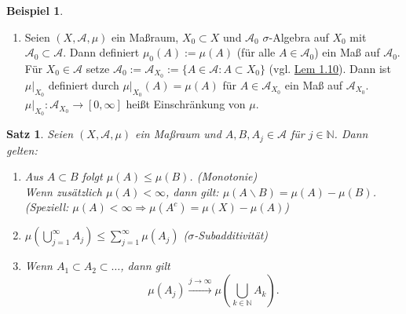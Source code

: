\documentclass[a4paper]{scrreprt}
\newcommand{\N}{\mathbb{N}}
\newcommand{\jlabel}[1]{\label{j_#1}}
\newcommand{\jhyperref}[2]{\hyperref[j_#1]{#2}}
\newcommand{\jlink}[1]{\jhyperref{#1}{#1}}
\theoremstyle{plain}
\newtheorem{satz}[thm]{Satz}
\theoremstyle{definition}
\newtheorem{expl}[thm]{Beispiel}
\begin{document}
{{\begin{expl}
\begin{enumerate}
        \item
            Seien $(X, \mathcal{A}, \mu)$ ein Maßraum, $X_0 \subset X$ und $\mathcal{A}_0$ $\sigma$-Algebra auf $X_0$ mit $\mathcal{A}_0 \subset \mathcal{A}$. Dann definiert $\mu_0(A) := \mu(A)$ (für alle $A\in \mathcal{A}_0$) ein Maß auf $\mathcal{A}_0$.\\
            Für $X_0 \in \mathcal{A}$ setze $\mathcal{A}_0 := \mathcal{A}_{X_0} := \{A \in \mathcal{A}: A\subset X_0\}$ (vgl. \jlink{Lem 1.10}). Dann ist $\mu|_{X_0}$ definiert durch $\mu|_{X_0}(A) = \mu(A)$ für $A\in \mathcal{A}_{X_0}$ ein Maß auf $\mathcal{A}_{X_0}$. $\mu|_{X_0}: \mathcal{A}_{X_0} \rightarrow [0,\infty]$ heißt Einschränkung von $\mu$.
    \end{enumerate}
\end{expl}


\begin{satz}
\jlabel{Satz 1.14}
    Seien $(X, \mathcal{A}, \mu)$ ein Maßraum und $A,B,A_j \in \mathcal{A}$ für $j \in \N$. Dann gelten:
    \begin{enumerate}
        \item Aus $A\subset B$ folgt $\mu(A) \le \mu(B)$. (Monotonie)\\
            Wenn zusätzlich $\mu(A) < \infty$, dann gilt: $\mu(A\backslash B) = \mu(A) - \mu(B)$.\\
            (Speziell: $\mu(A) < \infty \Rightarrow \mu(A^c) = \mu(X) - \mu(A)$)
        \item $\mu(\bigcup_{j=1}^\infty A_j) \le \sum_{j=1}^\infty \mu(A_j)$ ($\sigma$-Subadditivität)
        \item Wenn $A_1 \subset A_2 \subset \dots$, dann gilt
        \begin{displaymath}
            \mu(A_j) \xrightarrow{j\rightarrow\infty} \mu \left(\bigcup_{k \in\N} A_k \right).
        \end{displaymath}


\end{enumerate}
\end{satz}}}
\end{document}
